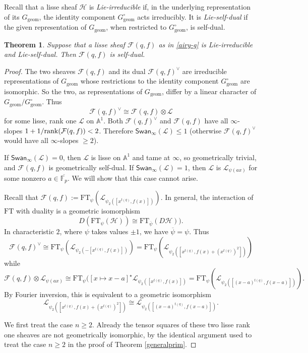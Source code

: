 \documentclass[11pt]{amsart}
\theoremstyle{plain}
\newtheorem{thm}{Theorem}
\theoremstyle{definition}
\numberwithin{thm}{section}
\numberwithin{equation}{thm}
\newcommand{\rank}{{\rm rank}}
\newcommand{\Swan}{\mathsf {Swan}}
\newcommand{\sF}{{\mathcal F}}
\newcommand{\sH}{{\mathcal H}}
\newcommand{\sL}{{\mathcal L}}
\newcommand{\A}{{\mathbb A}}
\newcommand{\F}{{\mathbb F}}
\newcommand{\0}{\emptyset}
\newcommand{\geo}{{\mathrm {geom}}}
\newcommand{\FT}{\mathrm{FT}}
\begin{document}
Recall that a lisse sheaf $\sH$ is {\it Lie-irreducible} if, in the underlying representation of its $G_{\geo}$, the identity component  $G_{\geo}^\circ$
  acts irreducibly.  It is {\it Lie-self-dual} if the  given representation of $G_{\geo}$, when restricted to $G_{\geo}^\circ$, is self-dual.
  
\begin{thm}\label{newauto}
Suppose that a lisse sheaf $\sF(q,f)$ as in \eqref{airy-g} is Lie-irreducible and Lie-self-dual. Then $\sF(q,f)$ is self-dual.
 \end{thm}
  
  \begin{proof}The two sheaves $\sF(q,f)$ and its dual $\sF(q,f)^\vee$ are irreducible representations of  $G_{\geo}$ whose restrictions to the identity component  $G_{\geo}^\circ$ are isomorphic. So the two, as representations of  $G_{\geo}$, differ by a linear character of   $G_{\geo}/G_{\geo}^\circ$.
  Thus 
  $$\sF(q,f)^\vee \cong \sF(q,f)\otimes \sL$$ 
  for some lisse, rank one $\sL$ on $\A^1$. Both $\sF(q,f)^\vee $ and $\sF(q,f)$
  have all $\infty$-slopes $1 +1/\rank(\sF(q,f)) <2$. Therefore $\Swan_\infty(\sL) \le 1$ (otherwise $\sF(q,f)^\vee$ would have all  $\infty$-slopes $\ge 2$). 
  
  If $\Swan_\infty(\sL) =0$, then $\sL$ is lisse on $\A^1$ and tame at $\infty$, so geometrically trivial, and $\sF(q,f)$ is geometrically self-dual.
  If $\Swan_\infty(\sL) =1$, then $\sL$ is $\sL_{\psi(ax)}$ for some nonzero $a \in \overline{\F_p}$. We will show that this case cannot arise.
  
  Recall that $\sF(q,f) :=\FT_{\psi}(\sL_{\psi_2([x^{t(q)},f(x)])})$. In general, the interaction of $\FT$ with duality is a geometric isomorphism
$$D(\FT_\psi(\sH)) \cong \FT_{\overline{\psi}}(D\sH)).$$
In characteristic $2$, where $\psi$ takes values $\pm 1$, we have $\overline{\psi}=\psi$. Thus 
$$\sF(q,f)^\vee \cong \FT_\psi(\sL_{\psi_2(-[x^{t(q)},f(x)])})=\FT_\psi(\sL_{\psi_2([x^{t(q)},f(x)+(x^{t(q)})^2])} )$$
while 
$$\sF(q,f)\otimes \sL_{\psi(ax)} \cong \FT_\psi([x \mapsto x-a]^\star \sL_{\psi_2([x^{t(q)},f(x)])}=\FT_\psi( \sL_{\psi_2([(x-a)^{t(q)},f(x-a)])}).$$
By Fourier inversion, this is equivalent to a geometric isomorphism
$$\sL_{\psi_2([x^{t(q)},f(x)+(x^{t(q)})^2])} \cong \sL_{\psi_2([(x-a)^{t(q)},f(x-a)])}.$$

We first treat the case $n \ge 2$. Already the tensor squares of these two lisse rank one sheaves are not geometrically isomorphic, by the identical argument used to treat the case $n \ge 2$ in the proof of Theorem \ref{generalprim}.


\end{proof}
\end{document}
